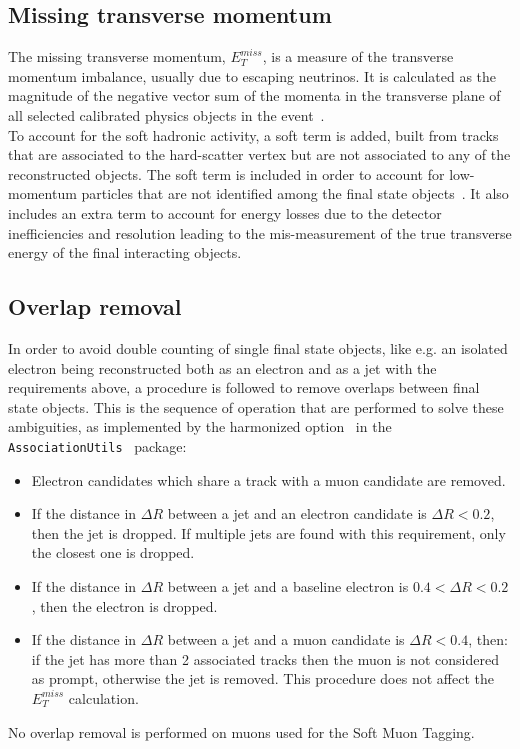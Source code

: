 \subsection{Missing transverse momentum}
\label{sec:object:met}
The missing transverse momentum, $E^{miss}_{T}$, is a measure of the transverse momentum
imbalance, usually due to escaping neutrinos. 
It is calculated as the magnitude of the negative vector sum of the momenta 
in the transverse plane of all selected calibrated physics objects in the event~\cite{MTM1,MTM2}. \\
To account for the soft hadronic activity, a soft term is added, built from
tracks that are associated to the hard-scatter vertex but are not
associated to any of the reconstructed objects. The soft term is
included in order to account for low-momentum particles that are not
identified among the final state objects~\cite{PERF-2011-07,PERF-2014-04,ATL-PHYS-PUB-2015-027}.
It also includes an extra term to account for energy losses due to the detector inefficiencies 
and resolution leading to the mis-measurement of the true transverse energy of the final 
interacting objects.

\subsection{Overlap removal}
\label{sec:object:over_rem}
In order to avoid double counting of single final state objects, like e.g. an 
isolated electron being reconstructed both as an electron and as a jet with the 
requirements above, a procedure is followed to remove overlaps between final state objects. 
This is the sequence of operation that are performed to solve these ambiguities, as 
implemented by the harmonized option~\cite{Adams:1743654} in the \texttt{AssociationUtils}~\cite{AssociationUtils} package:
\begin{itemize}
	\item Electron candidates which share a track with a muon candidate are removed.
	\item If the distance in $\Delta R$ between a jet and an electron candidate 
	is $\Delta R < 0.2$, then the jet is dropped. If multiple jets are found with this requirement, 
	only the closest one is dropped.
	\item If the distance in $\Delta R$ between a jet and a baseline
	electron is $0.4 < \Delta R < 0.2$, 
	then the electron is dropped.
	\item If the distance in $\Delta R$ between a jet and a muon
	candidate is $\Delta R < 0.4$, then: if 
	the jet has more than 2 associated tracks then the muon is not considered as prompt, otherwise the jet is removed. This procedure does not affect the $E^{miss}_{T}$ calculation.
\end{itemize}
No overlap removal is performed on muons used for the Soft Muon Tagging.


\label{soft_mu}


\clearpage

